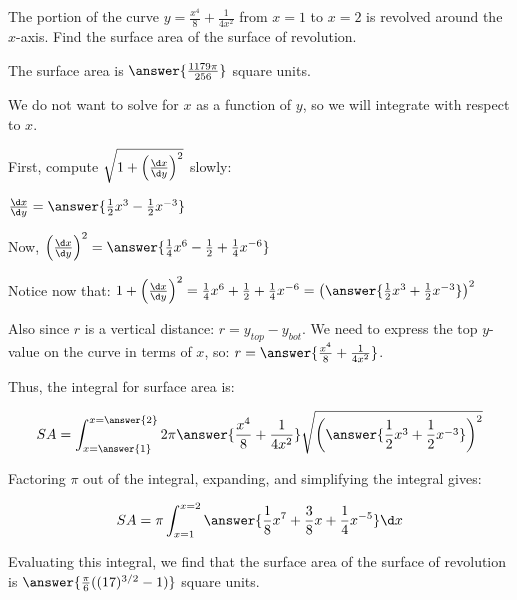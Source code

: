 \documentclass{ximera}
\author{Jim Talamo and Nicholas Hemleben}
\begin{document}
\begin{exercise}

The portion of the curve $y=\frac{x^4}{8} + \frac{1}{4x^2}$ from $x=1$ to $x=2$ is revolved around the $x$-axis.  Find the surface area of the surface of revolution.

The surface area is $\answer{ \frac {1179\pi }{256} }$ square units.

\begin{hint}
We do not want to solve for $x$ as a function of $y$, so we will integrate with respect to $x$.

\begin{question}
First, compute $\sqrt{1+\left(\frac{\d x}{\d y}\right)^2}$ slowly:

$\frac{\d x}{\d y} = \answer{\frac{1}{2}x^3 -\frac{1}{2} x^{-3}}$

\begin{question} 
Now, $\left(\frac{\d x}{\d y}\right)^2 = \answer{\frac{1}{4}x^6 - \frac{1}{2} + \frac{1}{4} x^{-6}}$

\begin{question}
Notice now that: 
$1+ \left(\frac{\d x}{\d y}\right)^2 = \frac{1}{4}x^6 + \frac{1}{2} + \frac{1}{4} x^{-6}=\left( \answer{ \frac {1}{2} x^3 + \frac{1}{2} x^{-3}}\right)^2$

\begin{question}
Also since $r$ is a vertical distance: $r=y_{top}-y_{bot}$.  We need to express the top $y$-value on the curve in terms of $x$, so: $r = \answer{\frac{x^4}{8} + \frac{1}{4x^2}}$.

\begin{question}
Thus, the integral for surface area is:

\[
SA = \int_{x=\answer{1}}^{x=\answer{2}} 2 \pi \answer{\frac{x^4}{8} + \frac{1}{4x^2}}\sqrt{\left(\answer{ \frac {1}{2} x^3 + \frac{1}{2} x^{-3}}\right)^2}
\]

\begin{question}
Factoring $\pi$ out of the integral, expanding, and simplifying the integral gives:

\[
SA= \pi \int_{x=1}^{x=2} \answer{\frac{1}{8} x^7 + \frac{3}{8} x + \frac{1}{4} x^{-5}} \d x 
\]

\end{question}
\end{question}
\end{question}
\end{question}
\end{question} 
\end{question}

\end{hint}

\begin{exercise}
Evaluating this integral, we find that the surface area of the surface of revolution is $\answer{\frac{\pi}{6} ((17)^{3/2} -1)}$ square units. 



\end{exercise}
\end{exercise}
\end{document}
